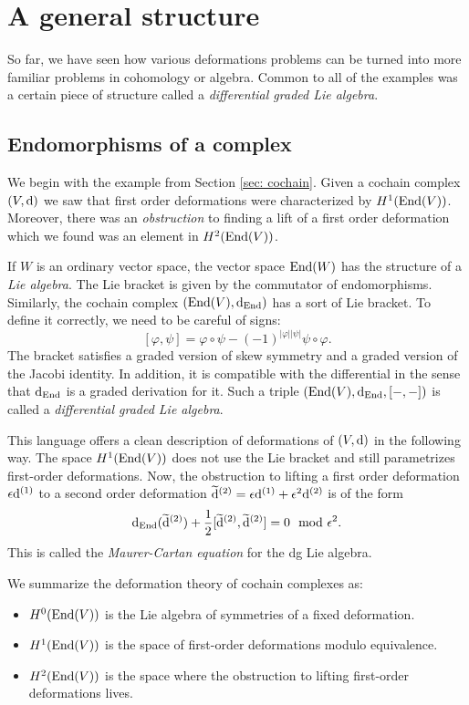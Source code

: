\documentclass[11pt]{amsart}
\begin{document}
\section{A general structure}

So far, we have seen how various deformations problems can be turned into more familiar problems in cohomology or algebra. 
Common to all of the examples was a certain piece of structure called a {\em differential graded Lie algebra}. 

\subsection{Endomorphisms of a complex}

We begin with the example from Section \ref{sec: cochain}. 
Given a cochain complex $(V,{\rm d})$ we saw that first order deformations were characterized by $H^1({\rm End}(V))$. 
Moreover, there was an {\em obstruction} to finding a lift of a first order deformation which we found was an element in $H^2({\rm End}(V))$. 

If $W$ is an ordinary vector space, the vector space ${\rm End}(W)$ has the structure of a {\em Lie algebra}. 
The Lie bracket is given by the commutator of endomorphisms. 
Similarly, the cochain complex $({\rm End}(V), {\rm d}_{{\rm End}})$ has a sort of Lie bracket. 
To define it correctly, we need to be careful of signs:
\[
[\varphi, \psi] = \varphi \circ \psi - (-1)^{|\varphi| |\psi|} \psi \circ \varphi .
\] 
The bracket satisfies a graded version of skew symmetry and a graded version of the Jacobi identity. 
In addition, it is compatible with the differential in the sense that ${\rm d}_{{\rm End}}$ is a graded derivation for it. 
Such a triple $({\rm End}(V), {\rm d}_{{\rm End}}, [-,-])$ is called a {\em differential graded Lie algebra}. 

This language offers a clean description of deformations of $(V,{\rm d})$ in the following way. 
The space $H^1({\rm End}(V))$ does not use the Lie bracket and still parametrizes first-order deformations. 
Now, the obstruction to lifting a first order deformation $\epsilon {\rm d}^{(1)}$ to a second order deformation $\widetilde{{\rm d}}^{(2)} = \epsilon {\rm d}^{(1)} + \epsilon^2 {\rm d}^{(2)}$ is of the form
\[
{\rm d}_{\rm End} (\widetilde{{\rm d}}^{(2)}) + \frac{1}{2} [\widetilde{{\rm d}}^{(2)}, \widetilde{{\rm d}}^{(2)}] = 0 \mod \epsilon^2 .
\]
This is called the {\em Maurer-Cartan equation} for the dg Lie algebra. 

We summarize the deformation theory of cochain complexes as:
\begin{itemize}
\item $H^0({\rm End}(V))$ is the Lie algebra of symmetries of a fixed deformation. 
\item $H^1({\rm End}(V))$ is the space of first-order deformations modulo equivalence.
\item $H^2({\rm End}(V))$ is the space where the obstruction to lifting first-order deformations lives.
\end{itemize}
\end{document}
